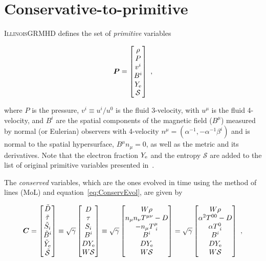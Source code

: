 \documentclass{article}
\newcommand{\igm}{\textsc{IllinoisGRMHD}\xspace}
\newcommand{\primv}{\bm{P}}
\newcommand{\consv}{\bm{C}}
\newcommand{\ye}{Y_{\rm e}}
\newcommand{\yet}{\tilde{Y}_{\rm e}}
\newcommand{\sqrtgamma}{\sqrt{\gamma}}
\newcommand{\ent}{\mathcal{S}}
\newcommand{\entstar}{\tilde{\ent}}
\newcommand{\eq}[1]{
\begin{equation}
    #1
\end{equation}
}
\begin{document}
\section{Conservative-to-primitive}

\igm defines the set of \emph{primitive} variables

\eq{
\primv = 
\begin{bmatrix}
\rho\\
P\\
v^{i}\\
B^{i}\\
\ye\\
\ent
\end{bmatrix}\ ,
}

\noindent where $P$ is the pressure, $v^{i} \equiv u^{i}/u^{0}$ is the fluid 3-velocity, with $u^{\mu}$ is the fluid 4-velocity, and $B^{i}$ are the spatial components of the magnetic field ($B^{\mu}$) measured by normal (or Eulerian) observers with 4-velocity $n^{\mu} = \left(\alpha^{-1},-\alpha^{-1}\beta^{i}\right)$ and is normal to the spatial hypersurface, $B^{\mu}n_{\mu}=0$, as well as the metric and its derivatives. Note that the electron fraction $\ye$ and the entropy $\ent$ are added to the list of original primitive variables presented in~\cite{etienne2015illinoisgrmhd}.

The \emph{conserved} variables, which are the ones evolved in time using the method of lines (MoL) and equation~\eqref{eq:ConservEvol}, are given by

\eq{
\consv = 
\begin{bmatrix}
\tilde{D}\\
\tilde{\tau}\\
\tilde{S}_{i}\\
\tilde{B}^{i}\\
\yet\\
\entstar
\end{bmatrix}
\equiv
\sqrtgamma
\begin{bmatrix}
D\\
\tau\\
S_{i}\\
B^{i}\\
D\ye\\
W \ent
\end{bmatrix}
\equiv
\sqrtgamma
\begin{bmatrix}
W\rho\\
n_{\mu}n_{\nu}T^{\mu\nu} - D\\
-n_{\mu}T^{\mu}_{\ i}\\
B^{i}\\
D\ye\\
W \ent
\end{bmatrix}
=
\sqrtgamma
\begin{bmatrix}
W\rho\\
\alpha^{2}T^{00} - D\\
\alpha T^{0}_{\ i}\\
B^{i}\\
D\ye\\
W \ent
\end{bmatrix}\ ,
}
\end{document}
